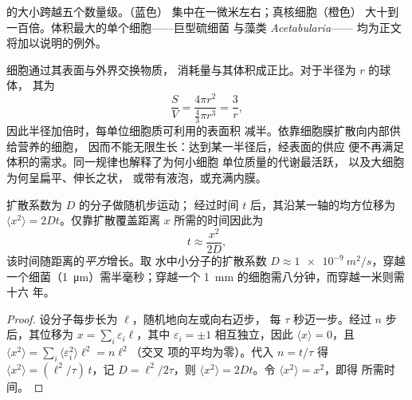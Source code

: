 \begin{omfigure}

{\small {}的大小跨越五个数量级。（蓝色）
集中在一微米左右；真核细胞（橙色）
大十到一百倍。体积最大的单个细胞——巨型硫细菌
与藻类 \emph{Acetabularia}——
均为正文将加以说明的例外。}
\end{omfigure}

\begin{proposition}\label{prop:b2:unicellular-diversity:surface}
细胞通过其表面与外界交换物质，
消耗量与其体积成正比。对于半径为 $r$ 的球体，
其\emph{}为
\[
\frac{S}{V} = \frac{4\pi r^2}{\tfrac{4}{3}\pi r^3} = \frac{3}{r},
\]
因此半径加倍时，每单位细胞质可利用的表面积
减半。依靠细胞膜扩散向内部供给营养的细胞，
因而不能无限生长：达到某一半径后，经表面的供应
便不再满足体积的需求。同一规律也解释了为何小细胞
单位质量的代谢最活跃，
以及大细胞为何呈扁平、伸长之状，
或带有液泡，或充满内膜。
\end{proposition}

\begin{theorem}[扩散一段距离所需的时间]\label{thm:b2:unicellular-diversity:diffusion}
扩散系数为 $D$ 的分子做随机步运动；
经过时间 $t$ 后，其沿某一轴的均方位移为
$\langle x^2\rangle = 2Dt$。仅靠扩散覆盖距离 $x$
所需的时间因此为
\[
t \approx \frac{x^2}{2D},
\]
该时间随距离的\emph{平方}增长。取
水中小分子的扩散系数 $D \approx \qty{1e-9}{m^2/s}$，穿越
一个细菌（\qty{1}{\micro m}）需半毫秒；穿越一个
\qty{1}{mm} 的细胞需八分钟，而穿越一米则需十六
年。
\end{theorem}
\begin{proof}
设分子每步长为 $\ell$，随机地向左或向右迈步，
每 $\tau$ 秒迈一步。经过 $n$ 步后，其位移为
$x = \sum_i \varepsilon_i \ell$，其中 $\varepsilon_i = \pm 1$
相互独立，因此 $\langle x\rangle = 0$，且 $\langle x^2\rangle =
\sum_i \langle\varepsilon_i^2\rangle \ell^2 = n\ell^2$（交叉
项的平均为零）。代入 $n = t/\tau$ 得 $\langle x^2\rangle
= (\ell^2/\tau)\,t$，记 $D = \ell^2/2\tau$，则
$\langle x^2\rangle = 2Dt$。令 $\langle x^2\rangle = x^2$，即得
所需时间。
\end{proof}

